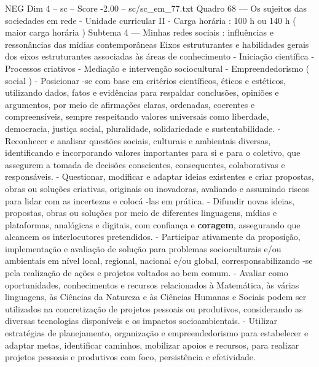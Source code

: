 \begin{textsample}{NEG Dim 4 – sc – Score -2.00 – sc/sc\_em\_77.txt}
Quadro 68 — Os sujeitos das sociedades em rede - Unidade curricular II - Carga horária : 100 h ou 140 h ( maior carga horária ) Subtema 4 — Minhas redes sociais : influências e ressonâncias das mídias contemporâneas Eixos estruturantes e habilidades gerais dos eixos estruturantes associadas às áreas de conhecimento - Iniciação científica - Processos criativos - Mediação e intervenção sociocultural - Empreendedorismo ( social ) - Posicionar -se com base em critérios científicos, éticos e estéticos, utilizando dados, fatos e evidências para respaldar conclusões, opiniões e argumentos, por meio de afirmações claras, ordenadas, coerentes e compreensíveis, sempre respeitando valores universais como liberdade, democracia, justiça social, pluralidade, solidariedade e sustentabilidade. - Reconhecer e analisar questões sociais, culturais e ambientais diversas, identificando e incorporando valores importantes para si e para o coletivo, que assegurem a tomada de decisões conscientes, consequentes, colaborativas e responsáveis. - Questionar, modificar e adaptar ideias existentes e criar propostas, obras ou soluções criativas, originais ou inovadoras, avaliando e assumindo riscos para lidar com as incertezas e colocá -las em prática. - Difundir novas ideias, propostas, obras ou soluções por meio de diferentes linguagens, mídias e plataformas, analógicas e digitais, com confiança e \textbf{coragem}, assegurando que alcancem os interlocutores pretendidos. - Participar ativamente da proposição, implementação e avaliação de solução para problemas socioculturais e/ou ambientais em nível local, regional, nacional e/ou global, corresponsabilizando -se pela realização de ações e projetos voltados ao bem comum. - Avaliar como oportunidades, conhecimentos e recursos relacionados à Matemática, às várias linguagens, às Ciências da Natureza e às Ciências Humanas e Sociais podem ser utilizados na concretização de projetos pessoais ou produtivos, considerando as diversas tecnologias disponíveis e os impactos socioambientais. - Utilizar estratégias de planejamento, organização e empreendedorismo para estabelecer e adaptar metas, identificar caminhos, mobilizar apoios e recursos, para realizar projetos pessoais e produtivos com foco, persistência e efetividade.

\end{textsample}
